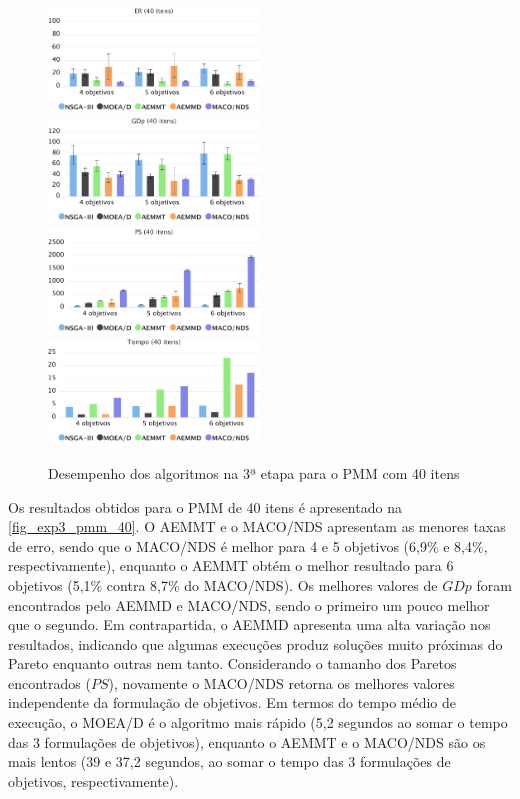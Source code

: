 \begin{figure}[!htbp]	
	\includegraphics[width=0.5\textwidth]{cap_experimentos/figs/etapa3/er-mkp-40}
	\includegraphics[width=0.5\textwidth]{cap_experimentos/figs/etapa3/gd-mkp-40}
	\includegraphics[width=0.5\textwidth]{cap_experimentos/figs/etapa3/ps-mkp-40}
	\includegraphics[width=0.5\textwidth]{cap_experimentos/figs/etapa3/time-mkp-40}
	\caption{\label{fig_exp3_pmm_40}Desempenho dos algoritmos na 3ª etapa para o PMM com 40 itens}
\end{figure}

Os resultados obtidos para o PMM de 40 itens é apresentado na \autoref{fig_exp3_pmm_40}. O AEMMT e o MACO/NDS apresentam as menores taxas de erro, sendo que o MACO/NDS é melhor para 4 e 5 objetivos (6,9\% e 8,4\%, respectivamente), enquanto o AEMMT obtém o melhor resultado para 6 objetivos (5,1\% contra 8,7\% do MACO/NDS). Os melhores valores de $GDp$ foram encontrados pelo AEMMD e MACO/NDS, sendo o primeiro um pouco melhor que o segundo. Em contrapartida, o AEMMD apresenta uma alta variação nos resultados, indicando que algumas execuções produz soluções muito próximas do Pareto enquanto outras nem tanto. Considerando o tamanho dos Paretos encontrados ($PS$), novamente o MACO/NDS retorna os melhores valores independente da formulação de objetivos. Em termos do tempo médio de execução, o MOEA/D é o algoritmo mais rápido (5,2 segundos ao somar o tempo das 3 formulações de objetivos), enquanto o AEMMT e o MACO/NDS são os mais lentos (39 e 37,2 segundos, ao somar o tempo das 3 formulações de objetivos, respectivamente).

